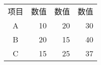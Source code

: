 \documentclass[nofonts]{ctexart}
\begin{document}
\begin{table}[htbp]
	\centering
	\begin{tabular}{crrr}
		\rowcolor{black!30}	%
		项目	& 数值	& 数值	& 数值	\\
		A		& 10	& 20	& 30	\\
		B		& 20	& 15	& 40	\\
		C		& 15	& 25	& 37	\\
	\end{tabular}
\end{table}
\end{document}
